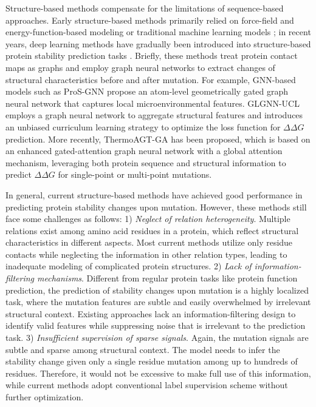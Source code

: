 \documentclass[journal,twoside,web]{ieeecolor}
\begin{document}
Structure-based methods compensate for the limitations of sequence-based approaches. Early structure-based methods primarily relied on force-field and energy-function-based modeling \cite{Schymkowitz2005,Kellogg2011_a} or traditional machine learning models \cite{Chen2020_a,Montanucci2019_a,Savojardo2016,Laimer2015,Pires2014_a,Dehouck2011_a}; in recent years, deep learning methods have gradually been introduced into structure-based protein stability prediction tasks \cite{Xu2024,Diaz2024,Blaabjerg2024,Li2020_b,Li2024_c,Cheng2024,Sun2025}. Briefly, these methods treat protein contact maps as graphs and employ graph neural networks to extract changes of structural characteristics before and after mutation. For example, GNN-based models such as ProS-GNN \cite{Wang2023} propose an atom-level geometrically gated graph neural network that captures local microenvironmental features. GLGNN-UCL \cite{Gong2023_a} employs a graph neural network to aggregate structural features and introduces an unbiased curriculum learning strategy to optimize the loss function for $\Delta\Delta G$ prediction. More recently, ThermoAGT-GA \cite{Madani2024_a} has been proposed, which is based on an enhanced gated-attention graph neural network with a global attention mechanism, leveraging both protein sequence and structural information to predict $\Delta\Delta G$ for single-point or multi-point mutations.

In general, current structure-based methods have achieved good performance in predicting protein stability changes upon mutation. However, these methods still face some challenges as follows: 1) \emph{Neglect of relation heterogeneity}. Multiple relations exist among amino acid residues in a protein, which reflect structural characteristics in different aspects. Most current methods utilize only residue contacts while neglecting the information in other relation types, leading to inadequate modeling of complicated protein structures. 2) \emph{Lack of information-filtering mechanisms}. Different from regular protein tasks like protein function prediction, the prediction of stability changes upon mutation is a highly localized task, where the mutation features are subtle and easily overwhelmed by irrelevant structural context. Existing approaches lack an information-filtering design to identify valid features while suppressing noise that is irrelevant to the prediction task. 3) \emph{Insufficient supervision of sparse signals}. Again, the mutation signals are subtle and sparse among structural context. The model needs to infer the stability change given only a single residue mutation among up to hundreds of residues. Therefore, it would not be excessive to make full use of this information, while current methods adopt conventional label supervision scheme without further optimization.
\end{document}
